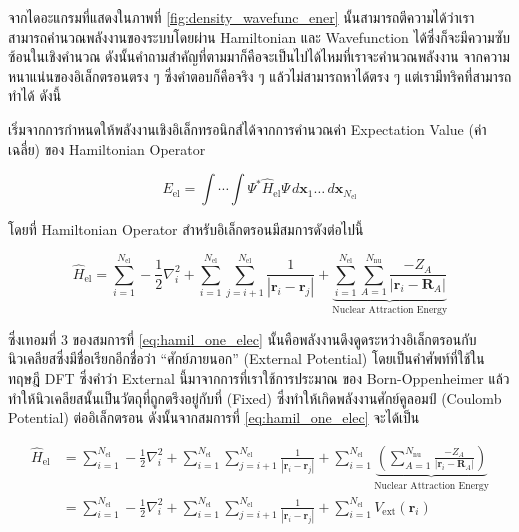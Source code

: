 จากไดอะแกรมที่แสดงในภาพที่ \ref{fig:density_wavefunc_ener} นั้นสามารถตีความได้ว่าเราสามารถคำนวณพลังงานของระบบโดยผ่าน 
Hamiltonian และ Wavefunction ได้ซึ่งก็จะมีความซับซ้อนในเชิงคำนวณ ดังนั้นคำถามสำคัญที่ตามมาก็คือจะเป็นไปได้ไหมที่เราจะคำนวณพลังงาน%
จากความหนาแน่นของอิเล็กตรอนตรง ๆ ซึ่งคำตอบก็คือจริง ๆ แล้วไม่สามารถหาได้ตรง ๆ แต่เรามีทริคที่สามารถทำได้ ดังนี้

เริ่มจากการกำหนดให้พลังงานเชิงอิเล็กทรอนิกส์ได้จากการคำนวณค่า Expectation Value (ค่าเฉลี่ย) ของ Hamiltonian Operator 

\begin{equation}\label{eq:ener_expect_value}
    E_{\text{el}} = \int \cdots \int \Psi^{\ast} \hat{H}_{\text{el}} \Psi \, d\bm{x}_{1} \dots \, 
    d\bm{x}_{N_{\text{el}}}
\end{equation}

\noindent โดยที่ Hamiltonian Operator สำหรับอิเล็กตรอนมีสมการดังต่อไปนี้

\begin{equation}\label{eq:hamil_one_elec}
    \hat{H}_{\text{el}} = \sum^{N_{\text{el}}}_{i=1} -\frac{1}{2} \nabla^{2}_{i} 
    + \sum^{N_{\text{el}}}_{i=1} \sum^{N_{\text{el}}}_{j=i+1} \frac{1}{|\bm{r}_{i}-\bm{r}_{j}|}
    + \underbrace{\sum^{N_{\text{el}}}_{i=1} \sum^{N_{\text{nu}}}_{A=1} \frac{-Z_{A}}{|\bm{r}_{i}-\bm{R}_{A}|}}%
    _{\text{Nuclear Attraction Energy}}
\end{equation}

\noindent ซึ่งเทอมที่ 3 ของสมการที่ \ref{eq:hamil_one_elec} นั้นคือพลังงานดึงดูดระหว่างอิเล็กตรอนกับนิวเคลียสซึ่งมีชื่อเรียกอีกชื่อว่า 
\enquote{ศักย์ภายนอก} (External Potential) โดยเป็นคำศัพท์ที่ใช้ในทฤษฎี DFT ซึ่งคำว่า External นี้มาจากการที่เราใช้การประมาณ%
ของ Born-Oppenheimer แล้วทำให้นิวเคลียสนั้นเป็นวัตถุที่ถูกตรึงอยู่กับที่ (Fixed) ซึ่งทำให้เกิดพลังงานศักย์คูลอมป์ (Coulomb Potential) 
ต่ออิเล็กตรอน ดังนั้นจากสมการที่ \ref{eq:hamil_one_elec} จะได้เป็น 

\begin{align}\label{eq:hamil_ext_pot}
    \hat{H}_{\text{el}} &= \sum^{N_{\text{el}}}_{i=1} -\frac{1}{2} \nabla^{2}_{i} 
    + \sum^{N_{\text{el}}}_{i=1} \sum^{N_{\text{el}}}_{j=i+1} \frac{1}{|\bm{r}_{i}-\bm{r}_{j}|}
    + \sum^{N_{\text{el}}}_{i=1} 
    \underbrace{\left ( \sum^{N_{\text{nu}}}_{A=1} \frac{-Z_{A}}{|\bm{r}_{i}-\bm{R}_{A}|} \right )}%
    _{\text{Nuclear Attraction Energy}} \nonumber \\
    &= \sum^{N_{\text{el}}}_{i=1} -\frac{1}{2} \nabla^{2}_{i} 
    + \sum^{N_{\text{el}}}_{i=1} \sum^{N_{\text{el}}}_{j=i+1} \frac{1}{|\bm{r}_{i}-\bm{r}_{j}|}
    + \sum^{N_{\text{el}}}_{i=1} V_{\text{ext}}(\bm{r}_{i})
\end{align}

